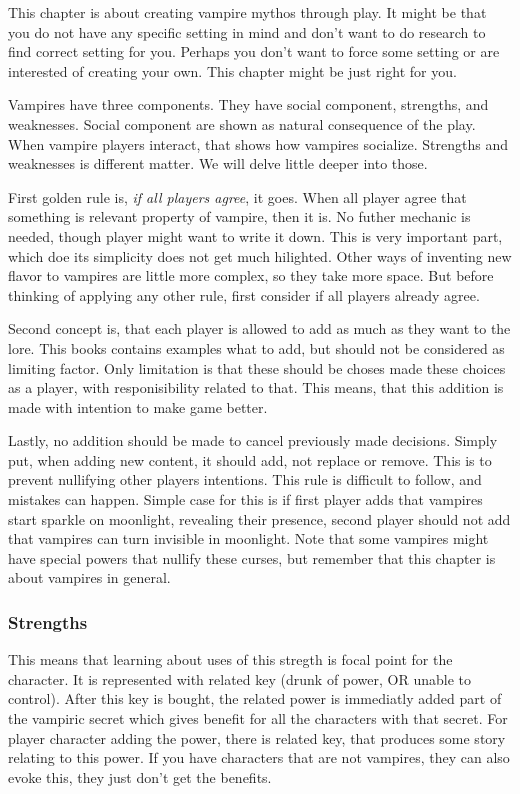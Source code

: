This chapter is about creating vampire mythos through play.
It might be that you do not have any specific setting in mind and don't want to do research to find correct setting for you.
Perhaps you don't want to force some setting or are interested of creating your own.
This chapter might be just right for you.

Vampires have three components.
They have social component, strengths, and weaknesses.
Social component are shown as natural consequence of the play.
When vampire players interact, that shows how vampires socialize.
Strengths and weaknesses is different matter.
We will delve little deeper into those.

First golden rule is, \textit{if all players agree}, it goes.
When all player agree that something is relevant property of vampire, then it is.
No futher mechanic is needed, though player might want to write it down.
This is very important part, which doe its simplicity does not get much hilighted.
Other ways of inventing new flavor to vampires are little more complex, so they take more space.
But before thinking of applying any other rule, first consider if all players already agree.

Second concept is, that each player is allowed to add as much as they want to the lore.
This books contains examples what to add, but should not be considered as limiting factor.
Only limitation is that these should be choses made these choices as a player, with responisibility related to that.
This means, that this addition is made with intention to make game better.

Lastly, no addition should be made to cancel previously made decisions.
Simply put, when adding new content, it should add, not replace or remove.
This is to prevent nullifying other players intentions.
This rule is difficult to follow, and mistakes can happen.
Simple case for this is if first player adds that vampires start sparkle on moonlight, revealing their presence, 
	second player should not add that vampires can turn invisible in moonlight.
Note that some vampires might have special powers that nullify these curses, 
	but remember that this chapter is about vampires in general.

\subsubsection{Strengths}
This means that learning about uses of this stregth is focal point for the character.
It is represented with related key (drunk of power, OR unable to control).
After this key is bought, the related power is immediatly added part of the vampiric secret which gives benefit for all the characters with that secret.
For player character adding the power, there is related key, that produces some story relating to this power.
If you have characters that are not vampires, they can also evoke this, they just don't get the benefits.

